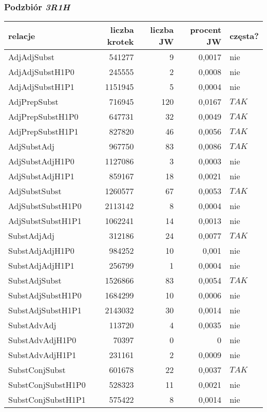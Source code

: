 \subsubsection{Podzbiór \protect\textit{3R1H}}
\begin{table}[h!]
\centering
\begin{tabular}{ l | r | r | r | l }
	\toprule
	\textbf{relacje} 	& \textbf{liczba krotek} & \textbf{liczba JW} & \textbf{procent JW} & \textbf{częsta?} 	\\
	\midrule
	AdjAdjSubst	&	541277	&	9	&	0,0017	&	nie	\\
	AdjAdjSubstH1P0	&	245555	&	2	&	0,0008	&	nie	\\
	AdjAdjSubstH1P1	&	1151945	&	5	&	0,0004	&	nie	\\
	AdjPrepSubst	&	716945	&	120	&	0,0167	&	$ TAK $	\\
	AdjPrepSubstH1P0	&	647731	&	32	&	0,0049	&	$ TAK $	\\
	AdjPrepSubstH1P1	&	827820	&	46	&	0,0056	&	$ TAK $	\\
	AdjSubstAdj	&	967750	&	83	&	0,0086	&	$ TAK $	\\
	AdjSubstAdjH1P0	&	1127086	&	3	&	0,0003	&	nie	\\
	AdjSubstAdjH1P1	&	859167	&	18	&	0,0021	&	nie	\\
	AdjSubstSubst	&	1260577	&	67	&	0,0053	&	$ TAK $	\\
	AdjSubstSubstH1P0	&	2113142	&	8	&	0,0004	&	nie	\\
	AdjSubstSubstH1P1	&	1062241	&	14	&	0,0013	&	nie	\\
	SubstAdjAdj	&	312186	&	24	&	0,0077	&	$ TAK $	\\
	SubstAdjAdjH1P0	&	984252	&	10	&	0,001	&	nie	\\
	SubstAdjAdjH1P1	&	256799	&	1	&	0,0004	&	nie	\\
	SubstAdjSubst	&	1526866	&	83	&	0,0054	&	$ TAK $	\\
	SubstAdjSubstH1P0	&	1684299	&	10	&	0,0006	&	nie	\\
	SubstAdjSubstH1P1	&	2143032	&	30	&	0,0014	&	nie	\\
	SubstAdvAdj	&	113720	&	4	&	0,0035	&	nie	\\
	SubstAdvAdjH1P0	&	70397	&	0	&	0	&	nie	\\
	SubstAdvAdjH1P1	&	231161	&	2	&	0,0009	&	nie	\\
	SubstConjSubst	&	601678	&	22	&	0,0037	&	$ TAK $	\\
	SubstConjSubstH1P0	&	528323	&	11	&	0,0021	&	nie	\\
	SubstConjSubstH1P1	&	575422	&	8	&	0,0014	&	nie	\\

\end{tabular}
\end{table}
